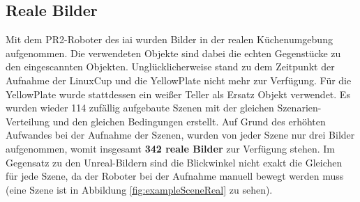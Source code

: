 \subsection{Reale Bilder}
Mit dem PR2-Roboter des \gls{iai} wurden Bilder in der realen Küchenumgebung aufgenommen. Die verwendeten Objekte sind dabei die echten Gegenstücke zu den eingescannten Objekten. Unglücklicherweise stand zu dem Zeitpunkt der Aufnahme der LinuxCup und die YellowPlate nicht mehr zur Verfügung. Für die YellowPlate wurde stattdessen ein weißer Teller als Ersatz Objekt verwendet. Es wurden wieder 114 zufällig aufgebaute Szenen mit der gleichen Szenarien-Verteilung und den gleichen Bedingungen erstellt. Auf Grund des erhöhten Aufwandes bei der Aufnahme der Szenen, wurden von jeder Szene nur drei Bilder aufgenommen, womit insgesamt \textbf{342 reale Bilder} zur Verfügung stehen. Im Gegensatz zu den Unreal-Bildern sind die Blickwinkel nicht exakt die Gleichen für jede Szene, da der Roboter bei der Aufnahme manuell bewegt werden muss (eine Szene ist in Abbildung \ref{fig:exampleSceneReal} zu sehen).

